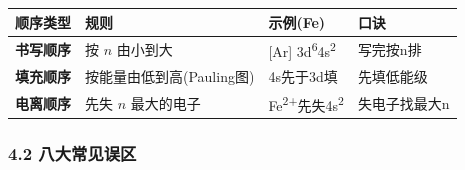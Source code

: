 \documentclass[a4paper,11pt]{ctexart}
\newcounter{none}
\newcommand{\箭}{\ensuremath{\rightarrow}}
\newcommand{\左箭}{\ensuremath{\leftarrow}}
\newcommand{\上箭}{\ensuremath{\uparrow}}
\newcommand{\下箭}{\ensuremath{\downarrow}}
\newcommand{\衡}{\ensuremath{\rightleftharpoons}}
\newcommand{\双箭}{\ensuremath{\leftrightarrow}}
\newcommand{\约等于}{\ensuremath{\approx}}
\newcommand{\小于等于}{\ensuremath{\leq}}
\newcommand{\大于等于}{\ensuremath{\geq}}
\newcommand{\不等于}{\ensuremath{\neq}}
\newcommand{\西格马}{\ensuremath{\sigma}}
\newcommand{\派}{\ensuremath{\pi}}
\begin{document}
{\def\LTcaptype{none} %
\begin{longtable}[]{@{}
  >{\raggedright\arraybackslash}p{}
  >{\raggedright\arraybackslash}p{}
  >{\raggedright\arraybackslash}p{}
  >{\raggedleft\arraybackslash}p{}@{}}
\toprule\noalign{}
\begin{minipage}[b]{\linewidth}\raggedright
顺序类型
\end{minipage} & \begin{minipage}[b]{\linewidth}\raggedright
规则
\end{minipage} & \begin{minipage}[b]{\linewidth}\raggedright
示例(Fe)
\end{minipage} & \begin{minipage}[b]{\linewidth}\raggedleft
口诀
\end{minipage} \\
\midrule\noalign{}
\endhead
\bottomrule\noalign{}
\endlastfoot
\textbf{书写顺序} & 按 \(n\) 由小到大 & {[}Ar{]} 3d\textsuperscript{6}4s\textsuperscript{2} & 写完按n排 \\
\textbf{填充顺序} & 按能量由低到高(Pauling图) & 4s先于3d填 & 先填低能级 \\
\textbf{电离顺序} & 先失 \(n\) 最大的电子 & Fe\textsuperscript{2+}先失4s\textsuperscript{2} & 失电子找最大n \\
\end{longtable}
}

\subsubsection{4.2 八大常见误区}\label{ux516bux5927ux5e38ux89c1ux8befux533a}
\end{document}
